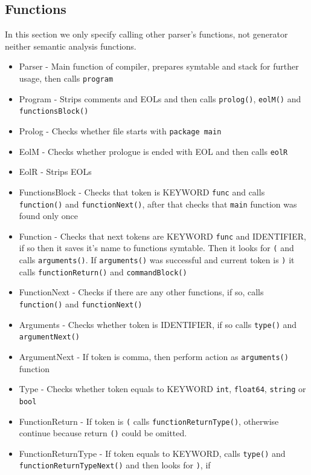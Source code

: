 \documentclass[11pt, titlepage]{article}
\begin{document}
\subsection{Functions}\label{functions}
In this section we only specify calling other parser's functions, not generator neither semantic analysis functions.
\begin{itemize}[itemsep=-5pt]
\item
  Parser - Main function of compiler, prepares symtable and stack for
  further usage, then calls \texttt{program}
\item
  Program - Strips comments and EOLs and then calls \texttt{prolog()},
  \texttt{eolM()} and \texttt{functionsBlock()}
\item
  Prolog - Checks whether file starts with \texttt{package\ main}
\item
  EolM - Checks whether prologue is ended with EOL and then calls
  \texttt{eolR}
\item
  EolR - Strips EOLs
\item
  FunctionsBlock - Checks that token is KEYWORD \texttt{func} and calls
  \texttt{function()} and \texttt{functionNext()}, after that checks that
  \texttt{main} function was found only once
\item
  Function - Checks that next tokens are KEYWORD \texttt{func} and IDENTIFIER, if so then it saves
  it's name to functions symtable. Then it looks for \texttt{(} and
  calls \texttt{arguments()}. If \texttt{arguments()} was successful
  and current token is \texttt{)} it calls \texttt{functionReturn()} and
  \texttt{commandBlock()}
\item
  FunctionNext - Checks if there are any other functions, if so, calls
  \texttt{function()} and \texttt{functionNext()}
\item
  Arguments - Checks whether token is IDENTIFIER, if so calls
  \texttt{type()} and \texttt{argumentNext()}
\item
  ArgumentNext - If token is comma, then perform action as
  \texttt{arguments()} function
\item
  Type - Checks whether token equals to KEYWORD \texttt{int}, \texttt{float64},
  \texttt{string} or \texttt{bool}
\item
  FunctionReturn - If token is \texttt{(} calls
  \texttt{functionReturnType()}, otherwise continue because
  return \texttt{()} could be omitted.
\item
  FunctionReturnType - If token equals to KEYWORD, calls \texttt{type()}
  and \texttt{functionReturnTypeNext()} and then looks for \texttt{)}, if

\end{itemize}
\end{document}
